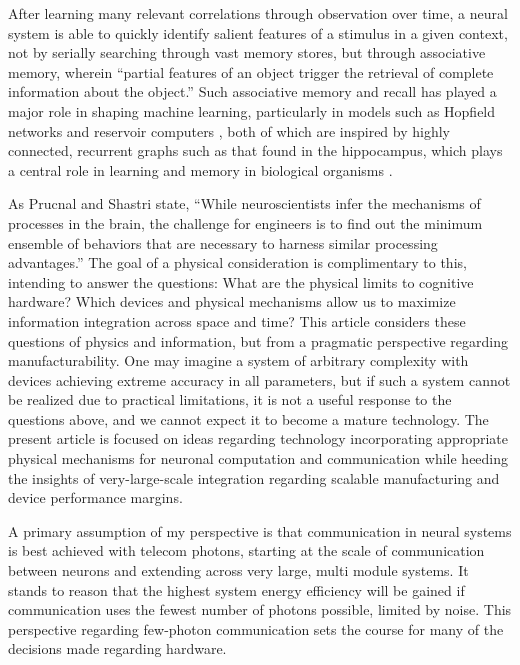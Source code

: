 After learning many relevant correlations through observation over time, a neural system is able to quickly identify salient features of a stimulus in a given context, not by serially searching through vast memory stores, but through associative memory, wherein ``partial features of an object trigger the retrieval of complete information about the object.'' \cite{abps1987} Such associative memory and recall has played a major role in shaping machine learning, particularly in models such as Hopfield networks \cite{ho1982} and reservoir computers \cite{}, both of which are inspired by highly connected, recurrent graphs such as that found in the hippocampus, which plays a central role in learning and memory in biological organisms \cite{}.

\vspace{3em}
As Prucnal and Shastri state, ``While neuroscientists infer the mechanisms of processes in the brain, the challenge for engineers is to find out the minimum ensemble of behaviors that are necessary to harness similar processing advantages.'' The goal of a physical consideration is complimentary to this, intending to answer the questions: What are the physical limits to cognitive hardware? Which devices and physical mechanisms allow us to maximize information integration across space and time? This article considers these questions of physics and information, but from a pragmatic perspective regarding manufacturability. One may imagine a system of arbitrary complexity with devices achieving extreme accuracy in all parameters, but if such a system cannot be realized due to practical limitations, it is not a useful response to the questions above, and we cannot expect it to become a mature technology. The present article is focused on ideas regarding technology incorporating appropriate physical mechanisms for neuronal computation and communication while heeding the insights of very-large-scale integration regarding scalable manufacturing and device performance margins. 

\vspace{3em}
A primary assumption of my perspective is that communication in neural systems is best achieved with telecom photons, starting at the scale of communication between neurons and extending across very large, multi module systems. It stands to reason that the highest system energy efficiency will be gained if communication uses the fewest number of photons possible, limited by noise. This perspective regarding few-photon communication sets the course for many of the decisions made regarding hardware.